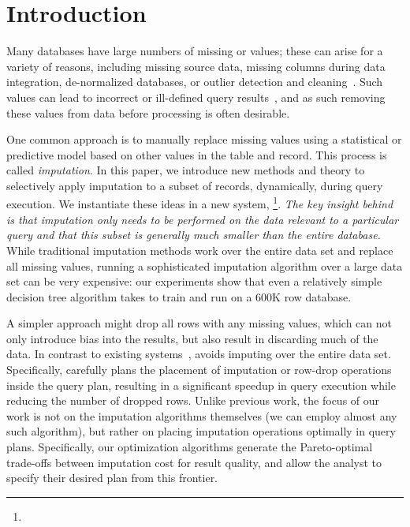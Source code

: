 \section{Introduction}

Many databases have large numbers of missing or \nullv{} values;  these can arise for a
variety of reasons, including missing source data,
missing columns during data integration, de-normalized databases, or outlier detection and
cleaning~\cite{kim2003}.  Such \nullv{} values can lead to incorrect or ill-defined query results~\cite{rubin1976}, and as such removing these values from data
before processing is often desirable.

One common approach is to manually replace missing values using a statistical or predictive model based on other values in the table and record.
This process is called \emph{imputation}.
In this paper, we introduce new methods and theory to selectively apply
imputation to a subset of records, dynamically, during query execution.
We instantiate these ideas in a new system, \ProjectName{}\footnote{\ProjectUrl{}}.  \emph{The key insight behind \ProjectName{} is that imputation
only needs to be performed on the data relevant to a particular query and
that this subset is generally much smaller than the entire database.}  
While traditional imputation methods work over the entire data set and replace all missing
values, running a sophisticated imputation algorithm over a large data set can be very
expensive: our experiments show that even a relatively simple decision tree algorithm takes \acsbaseresulthours{} to train and run
on a 600K row database.

A simpler approach might drop all rows with any missing values, which can not only introduce
bias into the results, but also result in discarding much of the data.
In contrast to existing systems~\cite{burgette2010multiple,akande2015empirical}, \ProjectName{} avoids imputing over the entire data set. Specifically, \ProjectName{}
carefully plans the placement of imputation or row-drop operations inside the query plan, resulting in a 
significant speedup in query execution while reducing the number of dropped rows. Unlike previous work, the focus of our work is not on the imputation algorithms themselves (we can employ almost any such algorithm), but rather on placing imputation operations
optimally in query plans.   Specifically, our optimization algorithms generate the
Pareto-optimal trade-offs between imputation cost for result quality,
and allow the analyst to specify their desired plan from this frontier.


